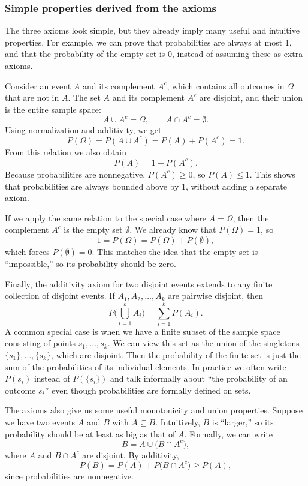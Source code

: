 \subsubsection{Simple properties derived from the axioms}

The three axioms look simple, but they already imply many useful and intuitive properties. For example, we can prove that probabilities are always at most 1, and that the probability of the empty set is 0, instead of assuming these as extra axioms.

Consider an event \(A\) and its complement \(A^c\), which contains all outcomes in \(\Omega\) that are not in \(A\). The set \(A\) and its complement \(A^c\) are disjoint, and their union is the entire sample space:
\[
A \cup A^c = \Omega, \qquad A \cap A^c = \emptyset.
\]
Using normalization and additivity, we get
\[
P(\Omega) = P(A \cup A^c) = P(A) + P(A^c) = 1.
\]
From this relation we also obtain
\[
P(A) = 1 - P(A^c).
\]
Because probabilities are nonnegative, \(P(A^c) \ge 0\), so \(P(A) \le 1\). This shows that probabilities are always bounded above by 1, without adding a separate axiom.

If we apply the same relation to the special case where \(A = \Omega\), then the complement \(A^c\) is the empty set \(\emptyset\). We already know that \(P(\Omega) = 1\), so
\[
1 = P(\Omega) = P(\Omega) + P(\emptyset),
\]
which forces \(P(\emptyset) = 0\). This matches the idea that the empty set is “impossible,” so its probability should be zero.

Finally, the additivity axiom for two disjoint events extends to any finite collection of disjoint events. If \(A_1, A_2, \dots, A_k\) are pairwise disjoint, then
\[
P\Big(\bigcup_{i=1}^k A_i\Big) = \sum_{i=1}^k P(A_i).
\]
A common special case is when we have a finite subset of the sample space consisting of points \(s_1, \dots, s_k\). We can view this set as the union of the singletons \(\{s_1\}, \dots, \{s_k\}\), which are disjoint. Then the probability of the finite set is just the sum of the probabilities of its individual elements. In practice we often write \(P(s_i)\) instead of \(P(\{s_i\})\) and talk informally about “the probability of an outcome \(s_i\)” even though probabilities are formally defined on sets.

\bigskip

The axioms also give us some useful monotonicity and union properties. Suppose we have two events \(A\) and \(B\) with \(A \subseteq B\). Intuitively, \(B\) is “larger,” so its probability should be at least as big as that of \(A\). Formally, we can write
\[
B = A \cup \big(B \cap A^c\big),
\]
where \(A\) and \(B \cap A^c\) are disjoint. By additivity,
\[
P(B) = P(A) + P\big(B \cap A^c\big) \ge P(A),
\]
since probabilities are nonnegative.

